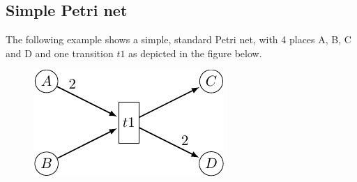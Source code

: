 

\bigskip
\subsection*{Simple Petri net} %
\label{sub:ex_pn}
The following example shows a simple, standard Petri net, with 4 places A, B, C and D and one transition $t1$ as depicted in the figure below.
\begin{figure}
\centering\includegraphics{figs/PN.pdf}
\end{figure}




